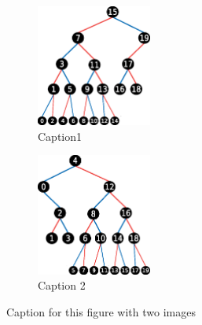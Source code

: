 \documentclass[sigplan,review,anonymous]{acmart}\settopmatter{printfolios=true,printccs=false,printacmref=false}
\begin{document}
\begin{figure}[h]
 
\begin{subfigure}{0.5\textwidth}
\includegraphics[width=0.4\linewidth, height=4cm]{images/unbalanced-S-T1-gap.eps} 
\caption{Caption1}
\label{fig:ST1}
\end{subfigure}
\begin{subfigure}{0.5\textwidth}
\includegraphics[width=0.4\linewidth, height=4cm]{images/unbalanced-S-T2-gap.eps}
\caption{Caption 2}
\label{fig:ST2}
\end{subfigure}
 
\caption{Caption for this figure with two images}
\label{fig:twoTreeS}
\end{figure}

 
\end{document}
